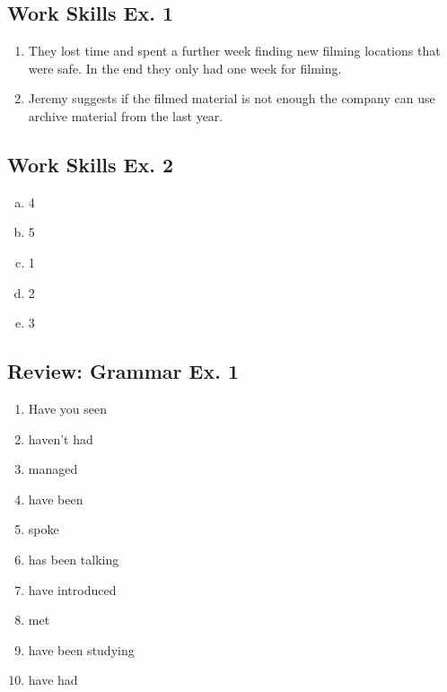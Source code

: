 \documentclass[12pt, a4paper, oneside]{article}
\begin{document}
  \subsection{Work Skills Ex. 1}
  \begin{enumerate}[1.]
    \item They lost time and spent a further week finding new filming locations that were safe. In the end they only had one week for filming.
    \item Jeremy suggests if the filmed material is not enough the company can use archive material from the last year.
  \end{enumerate} 

  \subsection{Work Skills Ex. 2}
  \begin{enumerate}[a.]
    \item 4
    \item 5
    \item 1
    \item 2 
    \item 3
  \end{enumerate}

  \subsection{Review: Grammar Ex. 1}
  \begin{enumerate}[1.]
    \item Have you seen
    \item haven't had
    \item managed
    \item have been
    \item spoke
    \item has been talking
    \item have introduced
    \item met
    \item have been studying
    \item have had
  \end{enumerate}
\end{document}
